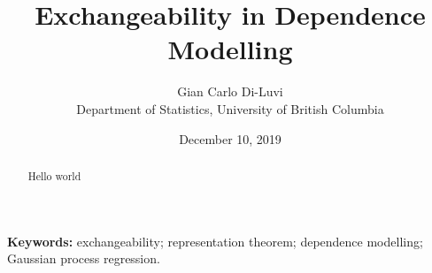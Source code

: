 \documentclass[10pt]{article}
\title{Exchangeability in Dependence Modelling} %
\author{Gian Carlo Di-Luvi 
\\
{\normalsize Department of Statistics, University of British Columbia}} %
\date{\normalsize December 10, 2019} %
\begin{document}
\maketitle
\thispagestyle{empty}

\vskip 0.5cm

\begin{abstract}
Hello world
\end{abstract}

\textbf{Keywords:} exchangeability; representation theorem; dependence modelling; Gaussian process regression.




\cleardoublepage
\setcounter{page}{1}


\vskip 2cm




\vskip 2cm




\vskip 2cm






\clearpage
\appendix



\vskip 2cm





\clearpage
\printbibliography
\end{document}
